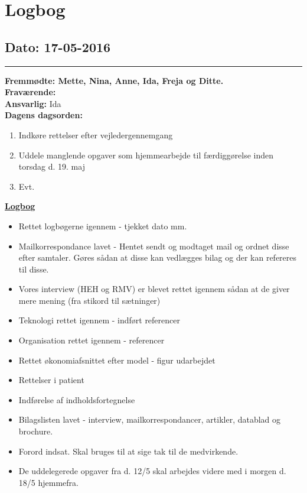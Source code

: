 \chapter{Logbog}
\section{Dato: 17-05-2016}
\hrule
\textbf{Fremmødte: Mette, Nina, Anne, Ida, Freja og Ditte.} \\
\textbf{Fraværende:} \\
\textbf{Ansvarlig:} Ida \\
\textbf{Dagens dagsorden: }
\begin{enumerate}
\item Indkøre rettelser efter vejledergennemgang
\item Uddele manglende opgaver som hjemmearbejde til færdiggørelse inden torsdag d. 19. maj
\item Evt.
\end{enumerate}

\underline{\textbf{Logbog}}
\begin{itemize}
\item Rettet logbøgerne igennem - tjekket dato mm.
\item Mailkorrespondance lavet - Hentet sendt og modtaget mail og ordnet disse efter samtaler. Gøres sådan at disse kan vedlægges bilag og der kan refereres til disse.
\item Vores interview (HEH og RMV) er blevet rettet igennem sådan at de giver mere mening (fra stikord til sætninger)
\item Teknologi rettet igennem - indført referencer
\item Organisation rettet igennem - referencer 
\item Rettet økonomiafsnittet efter model - figur udarbejdet
\item Rettelser i patient
\item Indførelse af indholdsfortegnelse
\item Bilagslisten lavet - interview, mailkorrespondancer, artikler, datablad og brochure.
\item Forord indsat. Skal bruges til at sige tak til de medvirkende.
\item De uddelegerede opgaver fra d. 12/5 skal arbejdes videre med i morgen d. 18/5 hjemmefra.
\end{itemize}

\newpage